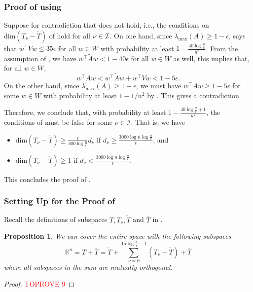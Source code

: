 \documentclass[11pt]{article}
\newtheorem{proposition}[theorem]{Proposition}
\def\dim#1{\mathrm{dim} (#1)}
\newcommand\ww{\boldsymbol{\mathit{w}}}
\renewcommand\AA{\boldsymbol{\mathit{A}}}
\newcommand\WW{\boldsymbol{\mathit{W}}}
\newcommand\VV{\boldsymbol{\mathit{V}}}
\newcommand\Ttil{{\tilde{\mathit{T}}}}
\newcommand\AAtil{\boldsymbol{\widetilde{\mathit{A}}}}
\begin{document}
\subsubsection*{Proof of  using }
Suppose for contradiction that  does not hold, i.e., the conditions on $\dim{T_\nu-\Ttil}$ of  hold for all $\nu \in \cal{I}$.
 On one hand, since $\lambda_{\max}(\AA)\geq 1-\epsilon$,  says that $\ww^{\top}\VV\ww\leq 35 \epsilon$ for all $\ww \in \WW$ with probability at least $1-\frac{40\log\frac{n}{\epsilon}}{n^2}$.
 From the assumption of , we have $\ww^{\top}\AAtil\ww < 1- 40\epsilon$ for all $\ww\in \WW$ as well, this implies that, for all $\ww \in \WW$,
\[
\ww^{\top}\AA\ww < \ww^{\top}\AAtil\ww +\ww^{\top}\VV\ww < 1-5\epsilon.
\]
On the other hand, since $\lambda_{\max}(\AA)\geq 1- \epsilon$, we must have  $\ww^{\top}\AA\ww \geq 1-5\epsilon$ for some $\ww\in \WW$ with probability at least $1-1/n^2$ by  .
This gives a contradiction. 

Therefore, we conclude that, with probability at least $1-\frac{40\log\frac{n}{\epsilon}+1}{n^2}$, the conditions of  must be false for some $\nu \in \mathcal{I}$. That is, we have
\begin{itemize}
\item $\dim{T_{\nu} -\tilde{T}} \geq \frac{\epsilon}{300\log\frac{n}{\epsilon}} d_{\nu}$ if $d_{\nu} \geq \frac{3000\log n\log\frac{n}{\epsilon}}{\epsilon}$, and 
\item $\dim{T_{\nu} -\tilde{T}} \geq 1$ if $d_{\nu} < \frac{3000\log n\log\frac{n}{\epsilon}}{\epsilon}$.
\end{itemize}
This concludes the proof of .


\subsubsection*{Setting Up for the Proof of }

Recall the definitions of subspaces $T,T_\nu,\Ttil$ and $\overline{T}$ in .

\begin{proposition}\label{prop:decomp space}
We can cover the entire space with the following subspaces
\begin{equation}\label{eq:SplitSpace}
 \mathbb{R}^n = T + \overline{T} = \tilde{T} + \sum_{\nu = 0}^{15\log \frac{n}{\epsilon}-1}(T_{\nu} -\tilde{T}) + \overline{T}
\end{equation}
where all subspaces in the sum are mutually orthogonal.
\end{proposition}
\begin{proof}\textcolor{red}{TOPROVE 9}\end{proof}
\end{document}
